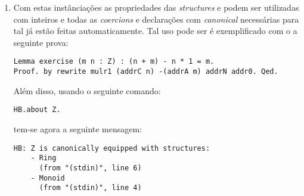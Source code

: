 {{\begin{enumerate}
\begin{lstlisting}[language=coq, frame=single, tabsize=1]
HB.instance Definition Z_Ring_axioms : Ring_of_Monoid Z :=
  Ring_of_Monoid.Build Z 1%Z Z.opp Z.mul
    Z.add_opp_diag_l Z.add_opp_diag_r Z.mul_assoc Z.mul_1_l Z.mul_1_r
    Z.mul_add_distr_r Z.mul_add_distr_l.
            \end{lstlisting}

        Note que na última instanciação não é necessário passar como argumento do construtor os argumentos para formação de um monoide. Isto ocorre pois estes construtores, conforme \cite{cohen:hal-02478907}, não são simplesmente construtores como os de \textit{records} e o addon  é infere estes argumentos automaticamente verificando a existência da instância declarada anteriormente com .

        \item Com estas instânciações as propriedades das \textit{structures}  e  podem ser utilizadas com inteiros e todas as \textit{coercions} e declarações com \textit{canonical} necessárias para tal já estão feitas automaticamente. Tal uso pode ser é exemplificado com o a seguinte prova:
            \begin{lstlisting}[language=coq, frame=single, tabsize=1]
Lemma exercise (m n : Z) : (n + m) - n * 1 = m.
Proof. by rewrite mulr1 (addrC n) -(addrA m) addrN addr0. Qed.
            \end{lstlisting}

        Além disso, usando o seguinte comando:
            \begin{lstlisting}[language=coq, frame=single, tabsize=1]
HB.about Z.
            \end{lstlisting}

        tem-se agora a seguinte mensagem:
            \begin{lstlisting}[language=coq-error, frame=single, tabsize=1]
HB: Z is canonically equipped with structures:
    - Ring
      (from "(stdin)", line 6)
    - Monoid
      (from "(stdin)", line 4)
            \end{lstlisting}


\end{enumerate}}}

